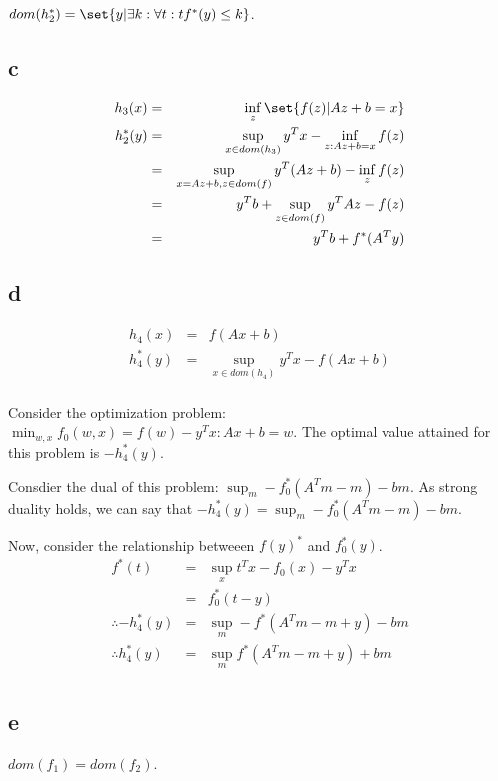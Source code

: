 \documentclass{article}
\begin{document}
$dom(h_2^{*}) = \set{y| \exists k: \forall t: tf^{*}(y) \leq k}$.

\subsection{c}
\begin{eqnarray*}
h_3(x) &=& \inf_z \set{f(z)|Az + b = x}\\
h_2^{*}(y) &=& \sup_{x \in dom(h_3)} y^{T}x - \inf_{z: Az + b = x} f(z)\\
&=& \sup_{x = Az + b, z\in dom(f) } y^{T}(Az + b) - \inf_{z} f(z)\\
&=& y^{T}b + \sup_{z\in dom(f) } y^{T}A z - f(z)\\
&=& y^{T}b + f^{*}(A^{T}y)\\
\end{eqnarray*}


\subsection{d}
\begin{eqnarray*}
h_4(x) &=& f(Ax + b)\\
h_4^{*}(y) &=& \sup_{x \in dom(h_4)} y^{T}x - f(Ax + b)\\
\end{eqnarray*}

Consider the optimization problem: $\min_{w, x} f_0(w, x) = f(w) - y^{T}x : Ax + b = w$. The optimal value attained for this problem is $-h_4^{*}(y)$.

Consdier the dual of this problem: $\sup_m -f_0^{*}(A^{T}m - m) - bm$. As strong duality holds, we can say that $-h_4^{*}(y) = \sup_m -f_0^{*}(A^{T}m - m) - bm$.

Now, consider the relationship betweeen $f(y)^{*}$ and $f_0^{*}(y)$.
\begin{eqnarray*}
f^{*}(t) &=& \sup_x t^{T}x - f_0(x) - y^{T}x\\
&=& f_0^{*}(t-y)\\
\therefore -h_4^{*}(y) &=& \sup_m -f^{*}(A^{T}m - m + y) - bm\\
\therefore h_4^{*}(y) &=& \sup_m f^{*}(A^{T}m - m + y) + bm\\
\end{eqnarray*}


\subsection{e}
\begin{assumption}
$dom(f_1) = dom(f_2)$.
\end{assumption}
\end{document}
